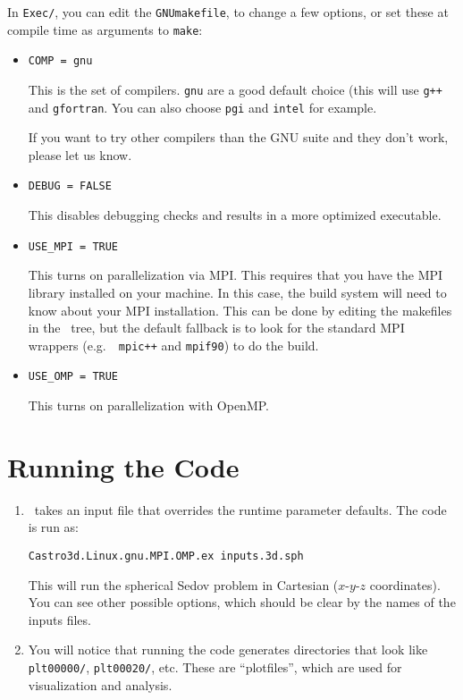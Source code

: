   In {\tt Exec/}, you can edit the {\tt GNUmakefile}, to change
  a few options, or set these at compile time as arguments to {\tt make}:
  \begin{itemize}

    \item {\tt COMP = gnu}

      This is the set of compilers.  {\tt gnu} are a good default
      choice (this will use {\tt g++} and {\tt gfortran}.  You can
      also choose {\tt pgi} and {\tt intel} for example.

      If you want to try other compilers than the GNU suite and they
      don't work, please let us know.

    \item {\tt DEBUG = FALSE}

      This disables debugging checks and results in a more
      optimized executable.

    \item {\tt USE\_MPI = TRUE}

      This turns on parallelization via MPI. This requires that you have the MPI library
      installed on your machine.  In this case, the build system will
      need to know about your MPI installation.  This can be done by
      editing the makefiles in the \amrex\ tree, but the default
      fallback is to look for the standard MPI wrappers (e.g.\ {\tt
        mpic++} and {\tt mpif90}) to do the build.

    \item {\tt USE\_OMP = TRUE}

      This turns on parallelization with OpenMP.

  \end{itemize}

\section{Running the Code}

\begin{enumerate}

\item \castro\ takes an input file that overrides the runtime parameter defaults.
  The code is run as:
\begin{verbatim}
Castro3d.Linux.gnu.MPI.OMP.ex inputs.3d.sph
\end{verbatim}

This will run the spherical Sedov problem in Cartesian ($x$-$y$-$z$
coordinates).  You can see other possible options, which should be
clear by the names of the inputs files.

\item You will notice that running the code generates directories that
  look like {\tt plt00000/}, {\tt plt00020/}, etc. These are ``plotfiles'',
  which are used for visualization and analysis.

\end{enumerate}

